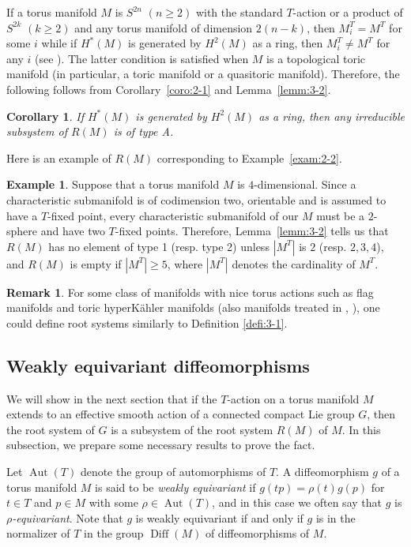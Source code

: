 \documentclass[12pt]{amsart}
\theoremstyle{plain} \numberwithin{equation}{section}
\newtheorem{coro}[theo]{Corollary}
\theoremstyle{definition}
\newtheorem{exam}[theo]{Example}
\newtheorem{rema}[theo]{Remark}
\def\fg{g}
\DeclareMathOperator{\Aut}{Aut}
\DeclareMathOperator{\Diff}{Diff}
\begin{document}
If a torus manifold $M$ is $S^{2n}$ $(n\ge 2)$ with the standard $T$-action or a product of $S^{2k}$ $(k\ge 2)$ and any torus manifold of dimension $2(n-k)$, then $M_i^T=M^T$ for some $i$ while if $H^*(M)$ is generated by $H^2(M)$ as a ring, then $M_i^T\not=M^T$ for any $i$ (see \cite{ma-pa06}).  The latter condition is satisfied when $M$ is a topological toric manifold (in particular, a toric manifold or a quasitoric manifold).  Therefore, the following follows from Corollary~\ref{coro:2-1} and Lemma~\ref{lemm:3-2}. 
\begin{coro} \label{coro:3-1}
If $H^*(M)$ is generated by $H^2(M)$ as a ring, then any irreducible subsystem of $R(M)$ is of type A.
\end{coro}

Here is an example of $R(M)$ corresponding to Example~\ref{exam:2-2}. 

\begin{exam} \label{exam:3-2}
Suppose that a torus manifold $M$ is $4$-dimensional.  Since a characteristic submanifold is of codimension two, orientable and is assumed to have a $T$-fixed point, every characteristic submanifold of our $M$ must be a $2$-sphere and have two $T$-fixed points.  Therefore, Lemma~\ref{lemm:3-2} tells us that $R(M)$ has no element of type 1 (resp. type 2) unless $|M^T|$ is $2$ (resp. $2,3,4$), and $R(M)$ is empty if $|M^T|\ge 5$, where $|M^T|$ denotes the cardinality of $M^T$.    
\end{exam}

\begin{rema}\label{rema:3-1}
For some class of manifolds with nice torus actions such as flag manifolds and toric hyperK\"ahler manifolds (also manifolds treated in \cite{kuro10-2}, \cite{kuro11-2}), one could define root systems similarly to Definition \ref{defi:3-1}. 
\end{rema}

\subsection{Weakly equivariant diffeomorphisms}

We will show in the next section that if the $T$-action on a torus manifold $M$ extends to an effective smooth action of a connected compact Lie group $G$, then the root system of $G$ is a subsystem of the root system $R(M)$ of $M$.   In this subsection, we prepare some necessary results to prove the fact. 

Let $\Aut(T)$ denote the group of automorphisms of $T$.  A diffeomorphism $\fg$ of a torus manifold $M$ is said to be \emph{weakly equivariant} if $\fg(tp)=\rho(t)\fg(p)$ for $t\in T$ and $p\in M$ with some $\rho\in\Aut(T)$, and in this case we often say that $\fg$ is \emph{$\rho$-equivariant}.  Note that $\fg$ is weakly equivariant if and only if $\fg$ is in the normalizer of $T$ in the group $\Diff(M)$ of diffeomorphisms of $M$. 
\end{document}
